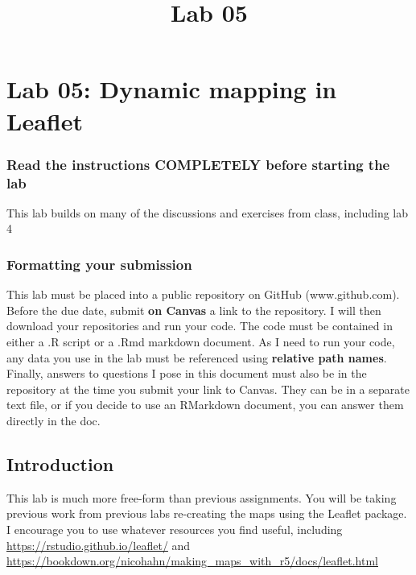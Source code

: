 \documentclass[]{article}
\title{Lab 05}
\author{}
\date{}
\makeatletter
\renewcommand{\maketitle}{\bgroup\vspace*{-1cm}\setlength{\parindent}{0pt}
\begin{flushleft}
  \@author
  
  \@date
  
\end{flushleft}\egroup
}
\makeatother
\begin{document}
\maketitle

\hypertarget{lab-05-dynamic-mapping-in-leaflet}{%
\section{Lab 05: Dynamic mapping in
Leaflet}\label{lab-05-dynamic-mapping-in-leaflet}}

\hypertarget{read-the-instructions-completely-before-starting-the-lab}{%
\subsubsection{Read the instructions COMPLETELY before starting the
lab}\label{read-the-instructions-completely-before-starting-the-lab}}

This lab builds on many of the discussions and exercises from class,
including lab 4

\hypertarget{formatting-your-submission}{%
\subsubsection{Formatting your
submission}\label{formatting-your-submission}}

This lab must be placed into a public repository on GitHub
(www.github.com). Before the due date, submit \textbf{on Canvas} a link
to the repository. I will then download your repositories and run your
code. The code must be contained in either a .R script or a .Rmd
markdown document. As I need to run your code, any data you use in the
lab must be referenced using \textbf{relative path names}. Finally,
answers to questions I pose in this document must also be in the
repository at the time you submit your link to Canvas. They can be in a
separate text file, or if you decide to use an RMarkdown document, you
can answer them directly in the doc.

\hypertarget{introduction}{%
\subsection{Introduction}\label{introduction}}

This lab is much more free-form than previous assignments. You will be
taking previous work from previous labs re-creating the maps using the
Leaflet package. I encourage you to use whatever resources you find
useful, including \url{https://rstudio.github.io/leaflet/} and
\url{https://bookdown.org/nicohahn/making_maps_with_r5/docs/leaflet.html}
\end{document}
